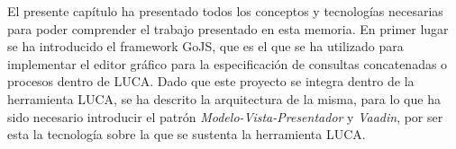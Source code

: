 El presente capítulo ha presentado todos los conceptos y tecnologías necesarias para poder comprender el trabajo presentado en esta memoria. En primer lugar se ha introducido el framework GoJS, que es el que se ha utilizado para implementar el editor gráfico para la especificación de consultas concatenadas o procesos dentro de LUCA. Dado que este proyecto se integra dentro de la herramienta LUCA, se ha descrito la arquitectura de la misma, para lo que ha sido necesario introducir el patrón \emph{Modelo-Vista-Presentador} y \emph{Vaadin}, por ser esta la tecnología sobre la que se sustenta la herramienta LUCA.  

